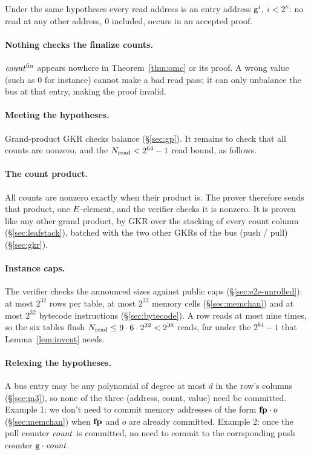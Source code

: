 \begin{corollary}\label{cor:addrrange}
Under the same hypotheses every read address is an entry address $\mathsf{g}^{i}$, $i<2^{\kappa}$: no read at any other address, $0$ included, occurs in an accepted proof.
\end{corollary}

\paragraph{Nothing checks the finalize counts.} $\mathit{count}^{\mathrm{fin}}$ appears nowhere in Theorem~\ref{thm:omc} or its proof. A wrong value (such as $0$ for instance) cannot make a bad read pass; it can only unbalance the bus at that entry, making the proof invalid.

\paragraph{Meeting the hypotheses.} Grand-product GKR checks balance (\S\ref{sec:gp}). It remains to check that all counts are nonzero, and the $N_{\mathrm{read}}<2^{64}-1$ read bound, as follows.

\paragraph{The count product.} All counts are nonzero exactly when their product is. The prover therefore sends that product, one $E$-element, and the verifier checks it is nonzero. It is proven like any other grand product, by GKR over the stacking of every count column (\S\ref{sec:leafstack}), batched with the two other GKRs of the bus (push / pull) (\S\ref{sec:gkr}).

\paragraph{Instance caps.} The verifier checks the announced sizes against public caps (\S\ref{sec:e2e-unrolled}): at most $2^{32}$ rows per table, at most $2^{32}$ memory cells (\S\ref{sec:memchan}) and at most $2^{32}$ bytecode instructions (\S\ref{sec:bytecode}). A row reads at most nine times, so the six tables flush $N_{\mathrm{read}}\le9\cdot6\cdot2^{32}<2^{38}$ reads, far under the $2^{64}-1$ that Lemma~\ref{lem:invcnt} needs.

\paragraph{Relexing the hypotheses.} A bus entry may be any polynomial of degree at most $d$ in the row's columns (\S\ref{sec:m3}), so none of the three (address, count, value) need be committed. Example 1: we don't need to commit memory addresses of the form $\mathbf{fp}\cdot o$ (\S\ref{sec:memchan}) when $\mathbf{fp}$ and $o$ are already committed. Example 2: once the pull counter $\mathit{count}$ is committed, no need to commit to the corrsponding push counter $\mathsf{g}\cdot\mathit{count}$.

